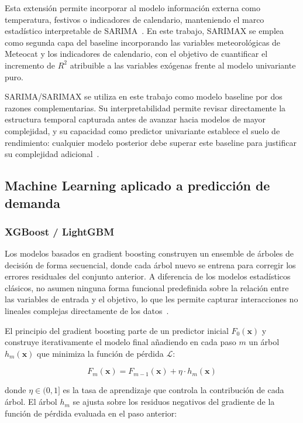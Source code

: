 \documentclass[12pt, a4paper]{article}
\begin{document}
Esta extensión permite incorporar al modelo información externa como temperatura, festivos o indicadores de calendario, manteniendo el marco estadístico interpretable de SARIMA~\cite{hyndman2021}. En este trabajo, SARIMAX se emplea como segunda capa del baseline incorporando las variables meteorológicas de Meteocat y los indicadores de calendario, con el objetivo de cuantificar el incremento de $R^2$ atribuible a las variables exógenas frente al modelo univariante puro.

SARIMA/SARIMAX se utiliza en este trabajo como modelo baseline por dos razones complementarias. Su interpretabilidad permite revisar directamente la estructura temporal capturada antes de avanzar hacia modelos de mayor complejidad, y su capacidad como predictor univariante establece el suelo de rendimiento: cualquier modelo posterior debe superar este baseline para justificar su complejidad adicional~\cite{hyndman2021, boxjenkins2015}.

\subsection{Machine Learning aplicado a predicción de demanda}


\subsubsection{XGBoost / LightGBM}


Los modelos basados en gradient boosting construyen un ensemble de árboles de decisión de forma secuencial, donde cada árbol nuevo se entrena para corregir los errores residuales del conjunto anterior. A diferencia de los modelos estadísticos clásicos, no asumen ninguna forma funcional predefinida sobre la relación entre las variables de entrada y el objetivo, lo que les permite capturar interacciones no lineales complejas directamente de los datos~\cite{chen2016, ke2017}.

El principio del gradient boosting parte de un predictor inicial $F_0(\mathbf{x})$ y construye iterativamente el modelo final añadiendo en cada paso $m$ un árbol $h_m(\mathbf{x})$ que minimiza la función de pérdida $\mathcal{L}$:

\begin{equation}
F_m(\mathbf{x}) = F_{m-1}(\mathbf{x}) + \eta \cdot h_m(\mathbf{x})
\end{equation}


donde $\eta \in (0,1]$ es la tasa de aprendizaje que controla la contribución de cada árbol. El árbol $h_m$ se ajusta sobre los residuos negativos del gradiente de la función de pérdida evaluada en el paso anterior:
\end{document}
